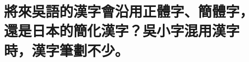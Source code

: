 %

\chapter[將來吳語的漢字會沿用正體字、簡體字，還是日本的簡化漢字？吳小字混用漢字時，漢字筆劃不少。]{將來吳語的漢字會沿用正體字、簡體字，還是日本的簡化漢字？吳小字混用漢字時，漢字筆劃不少。}


